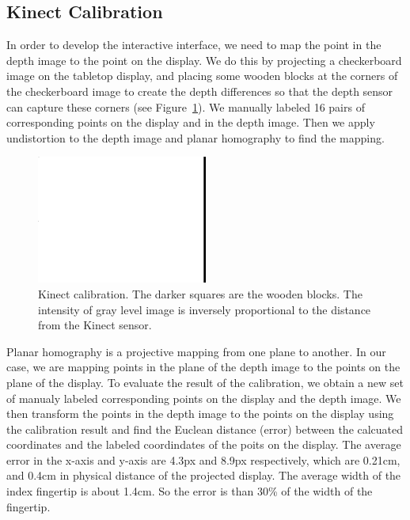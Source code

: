\subsection{Kinect Calibration}
In order to develop the interactive interface, we need to map the point in the
depth image to the point on the display. We do this by projecting a
checkerboard image on the tabletop display, and placing some wooden blocks at
the corners of the checkerboard image to create the depth differences so that 
the depth sensor can capture these corners (see Figure~\ref{fig:calibration}).
We manually labeled 16 pairs of corresponding points on the display and in the depth image. Then we
apply undistortion to the depth image and planar homography to find the mapping.

\begin{figure}[h]
  \centering
  \includegraphics[width=0.5\textwidth]{figures/calibration.png} 
  \caption{Kinect calibration. The darker squares are the wooden blocks. The
  intensity of gray level image is inversely proportional to the distance from
  the Kinect sensor.}
  \label{fig:calibration}
\end{figure}

Planar homography is a projective mapping from one plane to another. In our
case, we are mapping points in the plane of the depth image to the points
on the plane of the display. To evaluate the result of the calibration, we
obtain a new set of manualy labeled corresponding points on the display and the
depth image. We then transform the points in the depth image to the points on
the display using the calibration result and find the Euclean distance
(error) between the calcuated coordinates and the labeled coordindates of the
poits on the display. The average error in the x-axis and y-axis are 4.3px and 
8.9px respectively, which are 0.21cm, and 0.4cm in physical distance of the
projected display. The average width of the index fingertip is about 1.4cm. So
the error is than 30\% of the width of the fingertip. 

